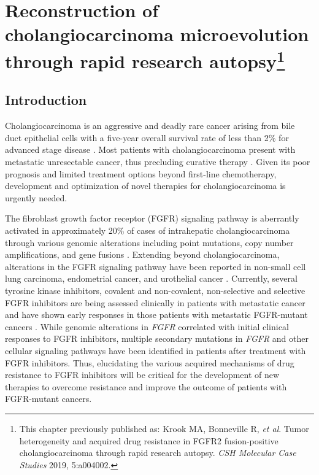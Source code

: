 \chapter[Reconstruction of cholangiocarcinoma microevolution through rapid research autopsy]{Reconstruction of cholangiocarcinoma microevolution through rapid research autopsy\footnote{This chapter previously published as: Krook MA\cofirst, Bonneville R\cofirst, \textit{et al}. Tumor heterogeneity and acquired drug resistance in FGFR2 fusion-positive cholangiocarcinoma through rapid research autopsy. \textit{CSH Molecular Case Studies} 2019, 5:a004002.}}
\label{ch:240}

\section{Introduction}
Cholangiocarcinoma is an aggressive and deadly rare cancer arising from bile duct epithelial cells with a five-year overall survival rate of less than 2\% for advanced stage disease \cite{pdqchol2002,razumilava2014}. Most patients with cholangiocarcinoma present with metastatic unresectable cancer, thus precluding curative therapy \cite{razumilava2014,valle2010}. Given its poor prognosis and limited treatment options beyond first-line chemotherapy, development and optimization of novel therapies for cholangiocarcinoma is urgently needed.

The fibroblast growth factor receptor (FGFR) signaling pathway is aberrantly activated in approximately 20\% of cases of intrahepatic cholangiocarcinoma through various genomic alterations including point mutations, copy number amplifications, and gene fusions \cite{roychowdhury2011_ngs,wu2013}. Extending beyond cholangiocarcinoma, alterations in the FGFR signaling pathway have been reported in non-small cell lung carcinoma, endometrial cancer, and urothelial cancer \cite{krook2020}. Currently, several tyrosine kinase inhibitors, covalent and non-covalent, non-selective and selective FGFR inhibitors are being assessed clinically in patients with metastatic cancer and have shown early responses in those patients with metastatic FGFR-mutant cancers \cite{andre2013,angevin2013,gozgit2012,javle2018,paik2017,tabernero2015}. While genomic alterations in \textit{FGFR} correlated with initial clinical responses to FGFR inhibitors, multiple secondary mutations in \textit{FGFR} and other cellular signaling pathways have been identified in patients after treatment with FGFR inhibitors. Thus, elucidating the various acquired mechanisms of drug resistance to FGFR inhibitors will be critical for the development of new therapies to overcome resistance and improve the outcome of patients with FGFR-mutant cancers.

